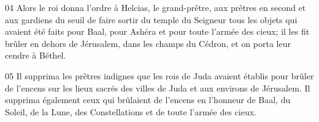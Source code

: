 
04 Alors le roi donna l’ordre à Helcias, le grand-prêtre, aux prêtres en second et aux gardiens du seuil de faire sortir du temple du Seigneur tous les objets qui avaient été faits pour Baal, pour Ashéra et pour toute l’armée des cieux; il les fit brûler en dehors de Jérusalem, dans les champs du Cédron, et on porta leur cendre à Béthel.

05 Il supprima les prêtres indignes que les rois de Juda avaient établis pour brûler de l’encens sur les lieux sacrés des villes de Juda et aux environs de Jérusalem. Il supprima également ceux qui brûlaient de l’encens en l’honneur de Baal, du Soleil, de la Lune, des Constellations et de toute l’armée des cieux.
